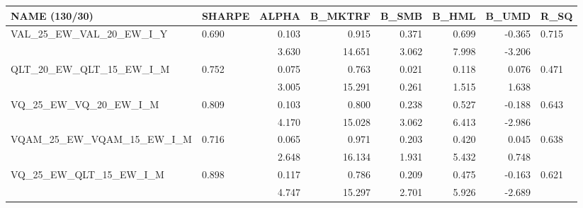 \begin{tabular}{llrrrrrl}
\toprule
NAME (130/30) & SHARPE & ALPHA & B\_MKTRF & B\_SMB & B\_HML & B\_UMD & R\_SQ \\
\midrule
VAL\_25\_EW\_VAL\_20\_EW\_I\_Y & 0.690 & 0.103 & 0.915 & 0.371 & 0.699 & -0.365 & 0.715 \\
 &  & 3.630 & 14.651 & 3.062 & 7.998 & -3.206 &  \\
QLT\_20\_EW\_QLT\_15\_EW\_I\_M & 0.752 & 0.075 & 0.763 & 0.021 & 0.118 & 0.076 & 0.471 \\
 &  & 3.005 & 15.291 & 0.261 & 1.515 & 1.638 &  \\
VQ\_25\_EW\_VQ\_20\_EW\_I\_M & 0.809 & 0.103 & 0.800 & 0.238 & 0.527 & -0.188 & 0.643 \\
 &  & 4.170 & 15.028 & 3.062 & 6.413 & -2.986 &  \\
VQAM\_25\_EW\_VQAM\_15\_EW\_I\_M & 0.716 & 0.065 & 0.971 & 0.203 & 0.420 & 0.045 & 0.638 \\
 &  & 2.648 & 16.134 & 1.931 & 5.432 & 0.748 &  \\
VQ\_25\_EW\_QLT\_15\_EW\_I\_M & 0.898 & 0.117 & 0.786 & 0.209 & 0.475 & -0.163 & 0.621 \\
 &  & 4.747 & 15.297 & 2.701 & 5.926 & -2.689 &  \\
\bottomrule
\end{tabular}
